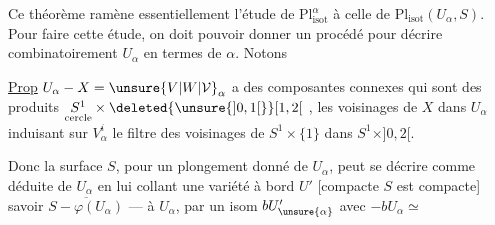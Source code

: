 
Ce théorème ramène essentiellement l'étude de $\mathrm{Pl}_{\mathrm{isot}}^\alpha$ à celle de $\mathrm{Pl}_{\mathrm{isot}}(U_\alpha,S)$. Pour faire cette étude, on doit pouvoir donner un procédé pour décrire combinatoirement $U_\alpha$ en termes de $\alpha$. Notons

\uline{Prop} $U_\alpha-X=\unsure{V|W|\mathcal V}_\alpha$ a des composantes connexes  qui sont des produits $\underset{\text{cercle}}{S^1}\times\deleted{\unsure{]0,1[}}[1,2[$  , les voisinages de $X$ dans $U_\alpha$ induisant sur $V_\alpha^i$ le filtre des voisinages de $S^1\times\{1\}$ dans $S^1\times]0,2[$.

\quad{}

Donc la surface $S$, pour un plongement donné de $U_\alpha$, peut se décrire comme  déduite de $U_\alpha$ en lui collant une variété  à bord $U'$ [compacte  $S$ est compacte]  savoir $\overline{S-\varphi(U_\alpha)}$ --- à $U_\alpha$, par un isom  $bU'_{\unsure{\alpha}}$ avec $-bU_\alpha\simeq$

